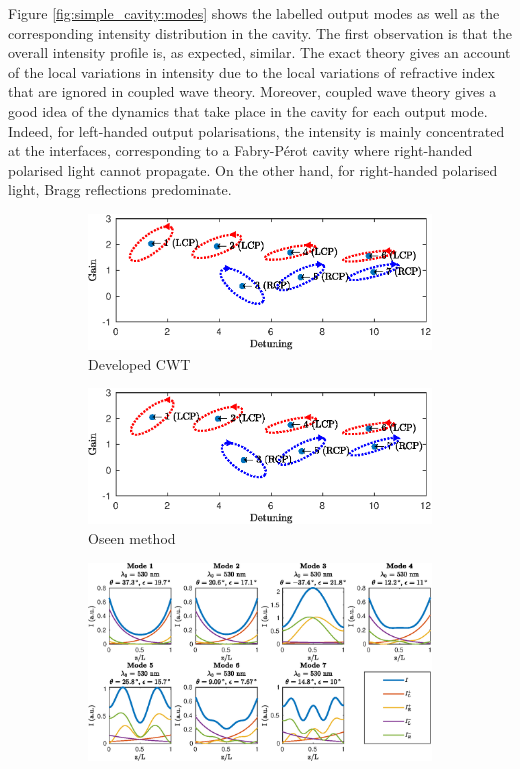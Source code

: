 Figure \ref{fig:simple_cavity:modes} shows the labelled output modes as well as the corresponding intensity distribution in the cavity. The first observation is that the overall intensity profile is, as expected, similar. The exact theory gives an account of the local variations in intensity due to the local variations of refractive index that are ignored in coupled wave theory. Moreover, coupled wave theory gives a good idea of the dynamics that take place in the cavity for each output mode. Indeed, for left-handed output polarisations, the intensity is mainly concentrated at the interfaces, corresponding to a Fabry-Pérot cavity where right-handed polarised light cannot propagate. On the other hand, for right-handed polarised light, Bragg reflections predominate.
\begin{figure}
	\centering
	\begin{subfigure}{.49\textwidth}
		\includegraphics[width=\textwidth]{plots/simple/modes_found}
		\caption{Developed CWT}
		\label{fig:simple_cavity:modes_found}
	\end{subfigure}
	\begin{subfigure}{.49\textwidth}
		\includegraphics[width=\textwidth]{plots/simple/modes_found_oseen}
		\caption{Oseen method}
		\label{fig:simple_cavity:modes_found_oseen}
	\end{subfigure}
	\begin{subfigure}{.49\textwidth}
		\includegraphics[width=\textwidth]{plots/simple/intensity_distribution}

\end{subfigure}
\end{figure}
